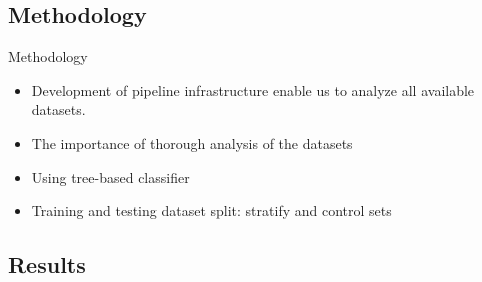 \documentclass{beamer}
\begin{document}
\subsection{Methodology}
\begin{frame}{Methodology}
\begin{itemize}
\item Development of pipeline infrastructure enable us to analyze all available datasets.
\item The importance of thorough analysis of the datasets
\item Using tree-based classifier
\item Training and testing dataset split: stratify and control sets
\end{itemize}
\end{frame}

\subsection{Results}
\end{document}
